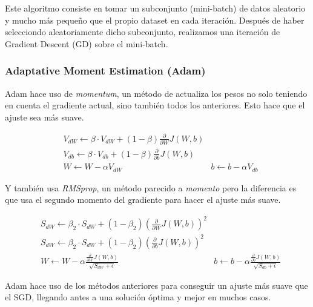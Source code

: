 Este algoritmo consiste en tomar un subconjunto (mini-batch) de datos aleatorio y mucho más pequeño que el propio dataset en cada iteración. Después de haber selecciondo aleatoriamente dicho subconjunto, realizamos una iteración de Gradient Descent (GD) sobre el mini-batch.

\subsubsection{Adaptative Moment Estimation (Adam)}

Adam hace uso de \textit{momentum}, un método de actualiza los pesos no solo teniendo en cuenta el gradiente actual, sino también todos los anteriores. Esto hace que el ajuste sea más suave.

\begin{align}
	&V_{dW} \leftarrow \beta \cdot V_{dW} + (1 - \beta) \frac{\partial}{\partial W} J(W,b)\\
	&V_{db} \leftarrow \beta \cdot V_{db} + (1 - \beta) \frac{\partial}{\partial b} J(W,b)\\
	&W \leftarrow W - \alpha V_{dW}
	&b \leftarrow b - \alpha V_{db}
\end{align}

Y también usa \textit{RMSprop}, un método parecido a \textit{momento} pero la diferencia es que usa el segundo momento del gradiente para hacer el ajuste más suave.

\begin{align}
	&S_{dW} \leftarrow \beta_2 \cdot S_{dW} + (1 - \beta_2) \left( \frac{\partial}{\partial W} J(W,b) \right)^2\\
	&S_{dW} \leftarrow \beta_2 \cdot S_{dW} + (1 - \beta_2) \left( \frac{\partial}{\partial b} J(W,b) \right)^2\\
	&W \leftarrow W - \alpha \frac{\frac{\partial}{\partial W} J(W,b)}{\sqrt{S_{dW} + \epsilon}}
	&b \leftarrow b - \alpha \frac{\frac{\partial}{\partial b} J(W,b)}{\sqrt{S_{db} + \epsilon}}
\end{align}

Adam hace uso de los métodos anteriores para conseguir un ajuste más suave que el SGD, llegando antes a una solución óptima y mejor en muchos casos.

